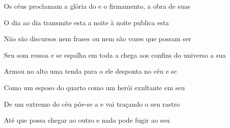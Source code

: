 \begin{greenumerate}
  \item {}Os céus proclamam a glória do  e o firmamento, a obra de suas 

  \item {}O dia ao dia transmite esta  a noite à noite publica esta 

  \item {}Não são discursos nem frases ou  nem são vozes que possam ser 

  \item {}Seu som ressoa e se espalha em toda a  chega aos confins do universo a sua 

  \item {}Armou no alto uma tenda para o  ele desponta no céu e se 

  \item {}Como um esposo do quarto  como um herói exultante em seu 

  \item {}De um extremo do céu põe-se a  e vai traçando o seu rastro 

  \item {}Até que possa chegar ao outro  e nada pode fugir ao seu 
\end{greenumerate}